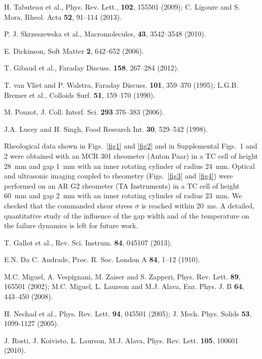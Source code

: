 \documentclass[twocolumn,superscriptaddress,showpacs,preprintnumbers,amsmath,amssymb,prl]{revtex4}
\begin{document}
\begin{thebibliography}{}
 H. Tabuteau et al., Phys. Rev. Lett., {\bf 102}, 155501 (2009); C. Ligoure and S. Mora, Rheol. Acta {\bf 52}, 91--114 (2013).

 P. J. Skrzeszewska et al., Macromolecules, {\bf 43}, 3542--3548 (2010).

 E. Dickinson, Soft Matter {\bf 2}, 642--652 (2006).

 T. Gibaud et al., Faraday Discuss. {\bf 158}, 267--284 (2012).


 T. van Vliet and P. Walstra, Faraday Discuss. {\bf 101}, 359--370 (1995); L.G.B. Bremer et al., Colloids Surf. {\bf 51}, 159--170 (1990).

 M. Pouzot, J. Coll. Interf. Sci. {\bf 293} 376--383 (2006).

 J.A. Lucey and H. Singh, Food Research Int. {\bf 30}, 529--542 (1998).

 Rheological data shown in Figs.~\ref{fig1} and \ref{fig2} and in Supplemental Figs.~1 and 2 were obtained with an MCR 301 rheometer (Anton Paar) in a TC cell of height 28~mm and gap 1~mm with an inner rotating cylinder of radius 24~mm. Optical and ultrasonic imaging coupled to rheometry (Figs.~\ref{fig3} and \ref{fig4}) were performed on an AR G2 rheometer (TA Instruments) in a TC cell of height 60~mm and gap 2~mm with an inner rotating cylinder of radius 23~mm. We checked that the commanded shear stress $\sigma$ is reached within 20~ms. A detailed, quantitative study of the influence of the gap width and of the temperature on the failure dynamics is left for future work.

 T. Gallot et al., Rev. Sci. Instrum. {\bf 84}, 045107 (2013).

 E.N. Da C. Andrade, Proc. R. Soc. London A {\bf 84}, 1--12 (1910).

 M.C. Miguel, A. Vespignani, M. Zaiser and S. Zapperi, Phys. Rev. Lett. {\bf 89}, 165501 (2002); M.C. Miguel, L. Laurson and M.J. Alava, Eur. Phys. J. B {\bf 64}, 443--450 (2008).

 H. Nechad et al., Phys. Rev. Lett. {\bf 94}, 045501 (2005); J. Mech. Phys. Solids {\bf 53}, 1099-1127 (2005).

 J. Rosti, J. Koivisto, L. Laurson, M.J. Alava, Phys. Rev. Lett. {\bf 105}, 100601 (2010).


\end{thebibliography}
\end{document}
